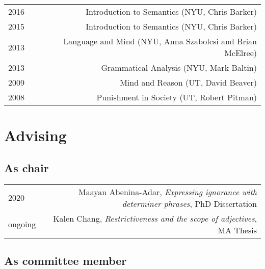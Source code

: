 \documentclass[12pt]{article}
\begin{document}
\begin{longtable}{LR}
  2016 & Introduction to Semantics (NYU, Chris Barker)
         \\
  2015 & Introduction to Semantics (NYU, Chris Barker)
         \\
  2013 & Language and Mind (NYU, Anna Szabolcsi and Brian McElree)
         \\
  2013 & Grammatical Analysis (NYU, Mark Baltin)
         \\
  2009 & Mind and Reason (UT, David Beaver)
         \\
  2008 & Punishment in Society (UT, Robert Pitman)
\end{longtable}


\medskip

\section*{Advising}

\subsection*{As chair}

\begin{longtable}{LR}
  2020    & Maayan Abenina-Adar, \textit{Expressing ignorance with determiner
            phrases}, PhD Dissertation\\
  ongoing & Kalen Chang, \textit{Restrictiveness and the scope of adjectives},
            MA Thesis
\end{longtable}

\subsection*{As committee member}
\end{document}
